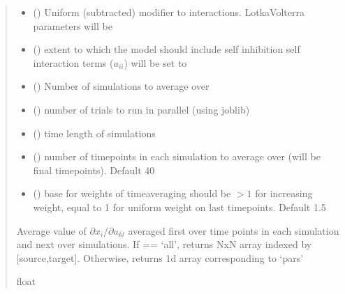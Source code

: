 \documentclass[letterpaper,10pt,english]{sphinxmanual}
\begin{document}
\begin{fulllineitems}
\begin{quote}
\begin{description}
\begin{itemize}
\item {} 
\sphinxAtStartPar
{} () \textendash{} Uniform (subtracted) modifier to interactions. Lotka\sphinxhyphen{}Volterra parameters will be {\hyperref[\detokenize{friendlynets:friendlyNet.friendlyNet.Adjacency}]{}} \sphinxhyphen{} 

\item {} 
\sphinxAtStartPar
{} () \textendash{} extent to which the model should include self inhibition \sphinxhyphen{} self interaction terms (\(a_{ii}\)) will be set to \sphinxhyphen{}

\item {} 
\sphinxAtStartPar
{} () \textendash{} Number of simulations to average over

\item {} 
\sphinxAtStartPar
{} () \textendash{} number of trials to run in parallel (using joblib)

\item {} 
\sphinxAtStartPar
{} () \textendash{} time length of simulations

\item {} 
\sphinxAtStartPar
{} () \textendash{} number of time\sphinxhyphen{}points in each simulation to average over (will be final time\sphinxhyphen{}points). Default 40

\item {} 
\sphinxAtStartPar
{} () \textendash{} base for weights of time\sphinxhyphen{}averaging \sphinxhyphen{} should be \(>1\) for increasing weight, equal to 1 for uniform weight on last  time\sphinxhyphen{}points. Default 1.5

\end{itemize}

\sphinxAtStartPar
Average value of \(\partial x_i/\partial a_{kl}\) averaged first over time points in each simulation and next over simulations. If  == ‘all’, returns NxN array indexed by {[}source,target{]}. Otherwise, returns 1d array corresponding to ‘pars’

\sphinxAtStartPar
float

\end{description}\end{quote}

\end{fulllineitems}
\end{document}
